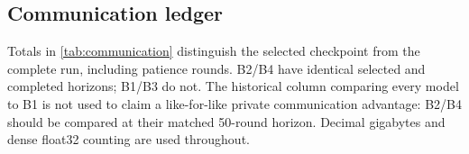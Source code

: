 \subsection{Communication ledger}

Totals in \cref{tab:communication} distinguish the selected checkpoint from
the complete run, including patience rounds. B2/B4 have identical selected
and completed horizons; B1/B3 do not. The historical column comparing every
model to B1 is not used to claim a like-for-like private communication
advantage: B2/B4 should be compared at their matched 50-round horizon.
Decimal gigabytes and dense float32 counting are used throughout.
\FloatBarrier
